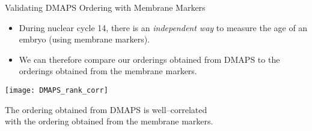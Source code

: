\begin{frame}{Validating DMAPS Ordering with Membrane Markers}

\begin{itemize}
\item During nuclear cycle 14, there is an {\em independent way} to measure the age of an embryo (using membrane markers).
%
\item We can therefore compare our orderings obtained from DMAPS to the orderings obtained from the membrane markers. 
\end{itemize}

	\centering
	\texttt{[image: DMAPS\_rank\_corr]}	
	
The ordering obtained from DMAPS is well--correlated \\ with the ordering obtained from the membrane markers.
	
\end{frame}
